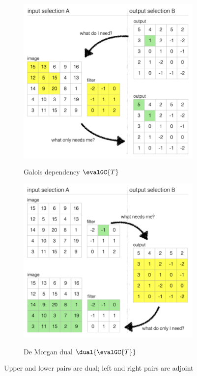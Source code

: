 \begin{figure}
   \begin{subfigure}{0.53\textwidth}
      {\includegraphics[scale=0.5]{fig/example/4-relations-1.png}}
      \vspace{2mm}
      \caption{Galois dependency $\evalGC{T}$}
      \label{fig:example:convolve-viz:galois-dependency}
   \end{subfigure}
   \begin{subfigure}{0.46\textwidth}
      {\includegraphics[scale=0.5]{fig/example/4-relations-2.png}}
      \vspace{2mm}
      \caption{De Morgan dual $\dual{\evalGC{T}}$}
      \label{fig:example:convolve-viz:de-morgan-dual}
   \end{subfigure}
   \caption{Upper and lower pairs are dual; left and right pairs are adjoint}
   \label{fig:example:convolve-viz}
\end{figure}
